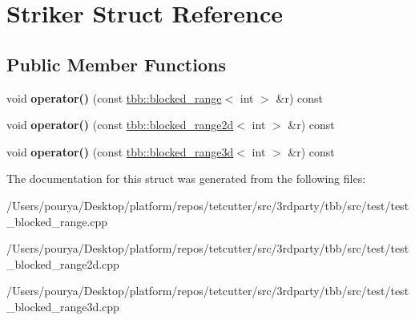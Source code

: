 \hypertarget{structStriker}{}\section{Striker Struct Reference}
\label{structStriker}
\subsection*{Public Member Functions}
\begin{DoxyCompactItemize}
\item 
\hypertarget{structStriker_a818c3209195f10ef3408311303111855}{}void {\bfseries operator()} (const \hyperlink{classtbb_1_1blocked__range}{tbb\+::blocked\+\_\+range}$<$ int $>$ \&r) const \label{structStriker_a818c3209195f10ef3408311303111855}

\item 
\hypertarget{structStriker_a9e576a064aa373648506fad03737e125}{}void {\bfseries operator()} (const \hyperlink{classtbb_1_1blocked__range2d}{tbb\+::blocked\+\_\+range2d}$<$ int $>$ \&r) const \label{structStriker_a9e576a064aa373648506fad03737e125}

\item 
\hypertarget{structStriker_a238550ed336fe82cf88ec91d9d7c9efc}{}void {\bfseries operator()} (const \hyperlink{classtbb_1_1blocked__range3d}{tbb\+::blocked\+\_\+range3d}$<$ int $>$ \&r) const \label{structStriker_a238550ed336fe82cf88ec91d9d7c9efc}

\end{DoxyCompactItemize}


The documentation for this struct was generated from the following files\+:\begin{DoxyCompactItemize}
\item 
/\+Users/pourya/\+Desktop/platform/repos/tetcutter/src/3rdparty/tbb/src/test/test\+\_\+blocked\+\_\+range.\+cpp\item 
/\+Users/pourya/\+Desktop/platform/repos/tetcutter/src/3rdparty/tbb/src/test/test\+\_\+blocked\+\_\+range2d.\+cpp\item 
/\+Users/pourya/\+Desktop/platform/repos/tetcutter/src/3rdparty/tbb/src/test/test\+\_\+blocked\+\_\+range3d.\+cpp\end{DoxyCompactItemize}
